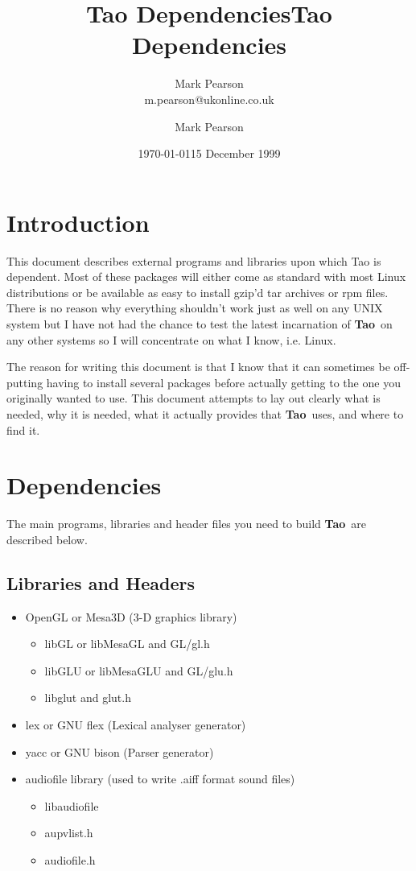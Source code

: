 \documentclass[a4paper,twoside]{report}
\title{Tao Dependencies}
\author{Mark Pearson\\
m.pearson@ukonline.co.uk}
\date{\today}
\title{Tao Dependencies}
\author{Mark Pearson}
\date{15 December 1999}
\newcommand{\tao}{\textbf{Tao}}
\renewcommand{\baselinestretch}{1.0}
\begin{document}
\maketitle

\renewcommand{\baselinestretch}{1}
\small\normalsize

\T\tableofcontents

\chapter{Introduction}
This document describes external programs and libraries upon which
Tao is dependent. Most of these packages will either come as
standard with most Linux distributions or be available as easy to
install gzip'd tar archives or rpm files. There is no reason
why everything shouldn't work just as well on any UNIX system
but I have not had the chance to test the latest incarnation of
\tao\ on any other systems so I will concentrate on what I know,
i.e. Linux. 

The reason for writing this document is that I know that it can
sometimes be off-putting having to install several packages before
actually getting to the one you originally wanted to use. This
document attempts to lay out clearly what is needed, why it is
needed, what it actually provides that \tao\ uses, and where to find
it.

\chapter{Dependencies}
The main programs, libraries and header files you need to build \tao\ are
described below.

\section{Libraries and Headers}
\begin{itemize}
\item OpenGL or Mesa3D (3-D graphics library)
	\begin{itemize}
	\item libGL or libMesaGL and GL/gl.h
	\item libGLU or libMesaGLU and GL/glu.h
	\item libglut and glut.h
	\end{itemize}
\item lex or GNU flex (Lexical analyser generator)
\item yacc or GNU bison (Parser generator)
\item audiofile library (used to write .aiff format sound files)
	\begin{itemize}
	\item libaudiofile
	\item aupvlist.h
	\item audiofile.h
	\end{itemize}
\end{itemize}
\end{document}
